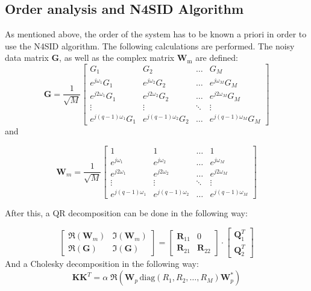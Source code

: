 \subsection{Order analysis and N4SID Algorithm}

As mentioned above, the order of the system has to be known a priori in order to use the N4SID algorithm. The following calculations are performed. The noisy data matrix $\textbf{G}$, as well as the complex matrix $\textbf{W}_\text{m}$ are defined:
\[
\textbf{G} = \frac{1}{\sqrt{M}}
\begin{bmatrix}
G_1 & G_2 & \dots & G_M \\
e^{j\omega_1}G_1 & e^{j\omega_2}G_2 & \dots & e^{j\omega_M}G_M \\
e^{j2\omega_1}G_1 & e^{j2\omega_2}G_2 & \dots & e^{j2\omega_M}G_M \\
\vdots & \vdots & \ddots & \vdots \\
e^{j(q-1)\omega_1}G_1 &e^{j(q-1)\omega_2} G_2 & \dots & e^{j(q-1)\omega_M}G_M 
\end{bmatrix} \]
and

\[
\textbf{W}_m = \frac{1}{\sqrt{M}}
\begin{bmatrix}
1 & 1 & \dots & 1 \\
e^{j\omega_1} & e^{j\omega_2} & \dots & e^{j\omega_M} \\
e^{j2\omega_1} & e^{j2\omega_2} & \dots & e^{j2\omega_M} \\
\vdots & \vdots & \ddots & \vdots \\
e^{j(q-1)\omega_1} &e^{j(q-1)\omega_2} & \dots & e^{j(q-1)\omega_M} 
\end{bmatrix}\]

After this, a QR decomposition can be done in the following way:

\[\begin{bmatrix}
\Re(\textbf{W}_m) & \Im(\textbf{W}_m) \\
\Re(\textbf{G}) & \Im(\textbf{G})
\end{bmatrix} = 
\begin{bmatrix}
\textbf{R}_{11} & 0 \\
\textbf{R}_{21} & \textbf{R}_{22}
\end{bmatrix}\cdot
\begin{bmatrix}
\textbf{Q}_1^T \\
\textbf{Q}_2^T
\end{bmatrix}
\]
And a Cholesky decomposition in the following way:
\[\textbf{K}\textbf{K}^T = \alpha\;\Re(\textbf{W}_p\,\text{diag}(R_1,R_2,\dots, R_M)\textbf{W}_p^*)\]

